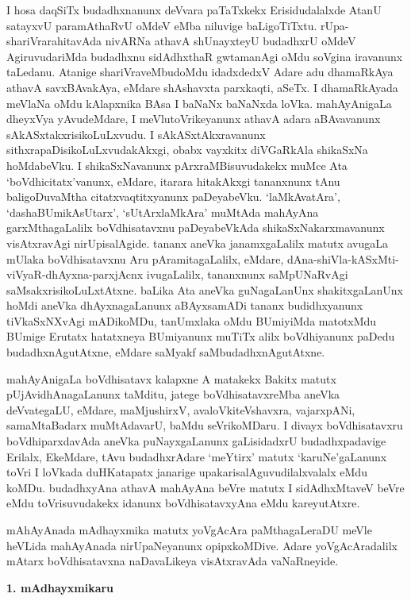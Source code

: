 I hosa daqSiTx budadhxnanunx deVvara paTaTxkekx Erisidudalalxde AtanU satayxvU para\-mAthaRvU oMdeV eMba niluvige baLigoTiTxtu. rUpa-shariVrarahitavAda nivARNa athavA shUnayxteyU budadhxrU oMdeV AgiruvudariMda budadhxnu sidAdhxthaR gwtama\-nAgi oMdu soVgina iravanunx taLedanu. Atanige shariVraveMbudoMdu idadxdedxV Adare adu dhamaRkAya athavA savxBAvakAya, eMdare shAshavxta parxkaqti, aSeTx. I dhamaR\-kAyada meVlaNa oMdu kAlapxnika BAsa I baNaNx baNaNxda loVka. mahAyAnigaLa dheyxVya yAvudeMdare, I meVlutoVrikeyanunx athavA adara aBAvavanunx sAkASx\-takxrisikoLuLxvudu. I sAkASxtAkxravanunx sithxrapaDisikoLuLxvudakAkxgi, obabx vayxkitx diVGaRkAla shikaSxNa hoMdabeVku. I shikaSxNavanunx pArxraMBisuvudakekx muMce Ata `boVdhicitatx'vanunx, eMdare, itarara hitakAkxgi tananxnunx tAnu baligoDuvaMtha citatxvaqtitxyanunx paDeyabeVku. `laMkAvatAra', `dashaBUmikAsUtarx', `sUtArxlaMkAra' muMtAda mahAyAna garxMtha\-gaLalilx boVdhisatavxnu paDeyabeVkAda shikaSxNakarxmavanunx visAtxravAgi nirUpisalAgide. tananx aneVka janamxgaLalilx matutx avugaLa mUlaka boVdhisatavxnu Aru pAramitagaLalilx, eMdare, dAna-shiVla-kASxMti-viVyaR-dhAyxna-parxjAcnx ivugaLalilx, tananxnunx saMpUNaR\-vAgi saMsakxrisikoLuLxtAtxne. baLika Ata aneVka guNagaLanUnx shakitxgaLanUnx hoMdi aneVka dhAyxnagaLanunx aBAyxsamADi tananx budidhxyanunx tiVkaSxNXvAgi mADikoMDu, tanUmxlaka oMdu BUmiyiMda matotxMdu BUmige Erutatx hatatxneya BUmiyanunx muTiTx alilx boVdhiyanunx paDedu budadhxnAgutAtxne, eMdare saMyakf saMbudadhxnAgutAtxne.

\newpage

mahAyAnigaLa boVdhisatavx kalapxne A matakekx Bakitx matutx pUjAvidhAnagaLanunx taMditu, jatege boVdhisatavxreMba aneVka deVvategaLU, eMdare, maMjushirxV, avaloVkiteVshavxra, vajarxpANi, samaMtaBadarx muMtAdavarU, baMdu seVrikoMDaru. I divayx boVdhisatavxru boVdhiparxdavAda aneVka puNayxgaLanunx gaLisidadxrU budadhxpadavige Erilalx, EkeMdare, tAvu budadhxrAdare `meYtirx' matutx `karuNe'gaLanunx toVri I loVkada duHKatapatx janarige upakarisalAguvudilalxvalalx eMdu koMDu. budadhxyAna athavA mahAyAna beVre matutx I sidAdhxMtaveV beVre eMdu toVrisuvudakekx idanunx boVdhisatavxyAna eMdu kareyutAtxre.

mAhAyAnada mAdhayxmika matutx yoVgAcAra paMthagaLeraDU meVle heVLida mahAyAnada nirUpaNeyanunx opipxkoMDive. Adare yoVgAcAradalilx mAtarx boVdhisatavxna naDavaLikeya visAtxravAda vaNaRneyide.

\medskip
\begin{center}
{\textbf{\Large 1. mAdhayxmikaru}}
\end{center}

